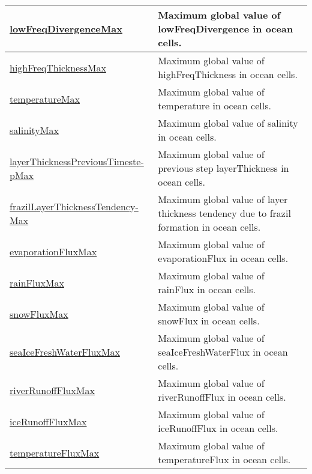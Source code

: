 {\begin{center}
\begin{longtable}{| p{2.0in} | p{4.0in} |}
    \hline
    \hyperref[subsec:var_sec_globalStatsAM_lowFreqDivergenceMax]{lowFreqDivergenceMax} & Maximum global value of lowFreqDivergence in ocean cells. \\
    \hline
    \hyperref[subsec:var_sec_globalStatsAM_highFreqThicknessMax]{highFreqThicknessMax} & Maximum global value of highFreqThickness in ocean cells. \\
    \hline
    \hyperref[subsec:var_sec_globalStatsAM_temperatureMax]{temperatureMax} & Maximum global value of temperature in ocean cells. \\
    \hline
    \hyperref[subsec:var_sec_globalStatsAM_salinityMax]{salinityMax} & Maximum global value of salinity in ocean cells. \\
    \hline
    \hyperref[subsec:var_sec_globalStatsAM_layerThicknessPreviousTimestepMax]{layerThicknessPreviousTimeste-}\hyperref[subsec:var_sec_globalStatsAM_layerThicknessPreviousTimestepMax]{pMax}  & Maximum global value of previous step layerThickness in ocean cells. \\
    \hline
    \hyperref[subsec:var_sec_globalStatsAM_frazilLayerThicknessTendencyMax]{frazilLayerThicknessTendency-}\hyperref[subsec:var_sec_globalStatsAM_frazilLayerThicknessTendencyMax]{Max}  & Maximum global value of layer thickness tendency due to frazil formation in ocean cells. \\
    \hline
    \hyperref[subsec:var_sec_globalStatsAM_evaporationFluxMax]{evaporationFluxMax} & Maximum global value of evaporationFlux in ocean cells. \\
    \hline
    \hyperref[subsec:var_sec_globalStatsAM_rainFluxMax]{rainFluxMax} & Maximum global value of rainFlux in ocean cells. \\
    \hline
    \hyperref[subsec:var_sec_globalStatsAM_snowFluxMax]{snowFluxMax} & Maximum global value of snowFlux in ocean cells. \\
    \hline
    \hyperref[subsec:var_sec_globalStatsAM_seaIceFreshWaterFluxMax]{seaIceFreshWaterFluxMax} & Maximum global value of seaIceFreshWaterFlux in ocean cells. \\
    \hline
    \hyperref[subsec:var_sec_globalStatsAM_riverRunoffFluxMax]{riverRunoffFluxMax} & Maximum global value of riverRunoffFlux in ocean cells. \\
    \hline
    \hyperref[subsec:var_sec_globalStatsAM_iceRunoffFluxMax]{iceRunoffFluxMax} & Maximum global value of iceRunoffFlux in ocean cells. \\
    \hline
    \hyperref[subsec:var_sec_globalStatsAM_temperatureFluxMax]{temperatureFluxMax} & Maximum global value of temperatureFlux in ocean cells. \\

\end{longtable}
\end{center}}
